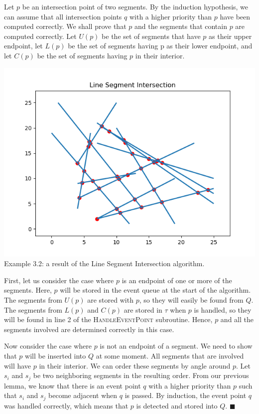 \documentclass{article}
\begin{document}
Let $p$ be an intersection point of two segments. By the induction hypothesis, we can assume that all intersection points $q$ with a higher priority than $p$ have been computed correctly. We shall prove that $p$ and the segments that contain $p$ are computed correctly. Let $U(p)$ be the set of segments that have $p$ as their upper endpoint, let $L(p)$ be the set of segments having p as their lower endpoint, and let $C(p)$ be the set of segments having $p$ in their interior.

\begin{center}
    \includegraphics[scale=0.54]{LinSegInt_1}\\
    \tiny{Example 3.2: a result of the Line Segment Intersection algorithm.}
\end{center}

First, let us consider the case where $p$ is an endpoint of one or more of the segments. Here, $p$ will be stored in the event queue at the start of the algorithm. The segments from $U(p)$ are stored with $p$, so they will easily be found from $Q$. The segments from $L(p)$ and $C(p)$ are stored in $\tau$ when $p$ is handled, so they will be found in line 2 of the \textsc{HandleEventPoint} subroutine. Hence, $p$ and all the segments involved are determined correctly in this case.

Now consider the case where $p$ is not an endpoint of a segment. We need to show that $p$ will be inserted into $Q$ at some moment. All segments that are involved will have $p$ in their interior. We can order these segments by angle around $p$. Let $s_i$ and $s_j$ be two neighboring segments in the resulting order. From our previous lemma, we know that there is an event point $q$ with a higher priority than $p$ such that $s_i$ and $s_j$ become adjacent when $q$ is passed. By induction, the event point $q$ was handled correctly, which means that $p$ is detected and stored into $Q$. \hfill $\blacksquare$
\end{document}
